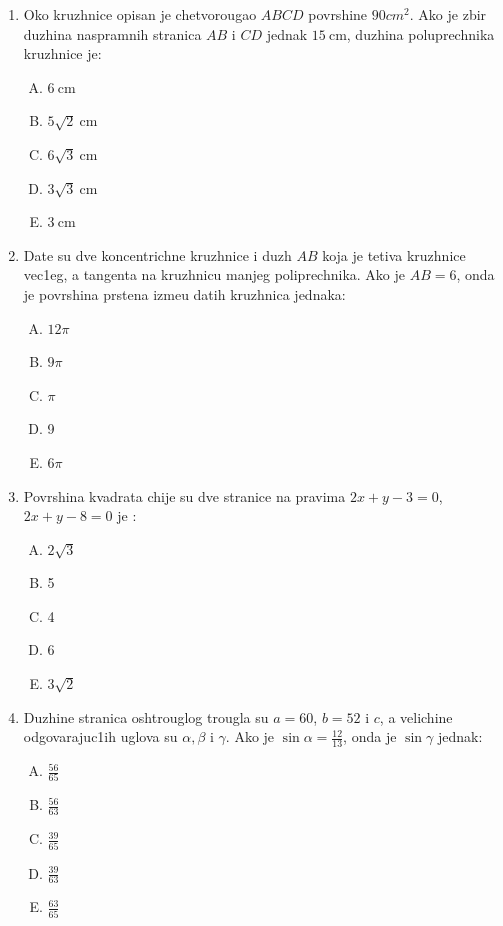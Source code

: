 \documentclass[a4paper,12pt]{article}
\newcommand{\Lat}{\fontencoding{OT1}\selectfont}
\begin{document}
\begin{enumerate}[1.]
\item Oko kruzhnice opisan je chetvorougao $ABCD$ povrshine $90cm^2$. Ako je zbir duzhina naspramnih stranica $AB$ i $CD$ jednak $15\mathrm{\ cm}$, duzhina poluprechnika kruzhnice je: 
{\Lat
\begin{multicols}{5}
\begin{enumerate}[A)]
\item $6\mathrm{\ cm}$ \item $5\sqrt{2}\mathrm{\ cm}$ \item $6\sqrt{3}\mathrm{\ cm}$ \item $3\sqrt{3}\mathrm{\ cm}$ \item $3\mathrm{\ cm}$
\end{enumerate}
\end{multicols}
}

\item Date su dve koncentrichne kruzhnice i duzh $AB$ koja je tetiva kruzhnice vec1eg, a tangenta na kruzhnicu manjeg poliprechnika. Ako je $AB = 6$, onda je povrshina prstena izme\dj{}u datih kruzhnica jednaka: 
{\Lat
\begin{multicols}{5}
\begin{enumerate}[A)]
\item $12\pi$  \item $9\pi$ \item $\pi$ \item 9 \item $6\pi$
\end{enumerate}
\end{multicols}
}

\item Povrshina kvadrata chije su dve stranice na pravima $2x + y - 3 = 0$, $2x +y -8 = 0$ je :
{\Lat
\begin{multicols}{5}
\begin{enumerate}[A)]
\item $2\sqrt{3}$  \item 5 \item 4 \item 6 \item $3\sqrt{2}$
\end{enumerate}
\end{multicols}
}

\item Duzhine stranica oshtrouglog trougla su $a = 60$, $ b = 52$ i $c$, a velichine odgovarajuc1ih uglova su $\alpha,\beta  $ i $\gamma $. Ako je $\sin{\alpha } = \frac{12}{13}$, onda je $\sin{\gamma }$ jednak:
{\Lat
\begin{multicols}{5}
\begin{enumerate}[A)]
\item $\frac{56}{65}$  \item $\frac{56}{63}$ \item $\frac{39}{65}$ \item $\frac{39}{63}$ \item $\frac{63}{65}$
\end{enumerate}
\end{multicols}
}

\end{enumerate}
\end{document}

